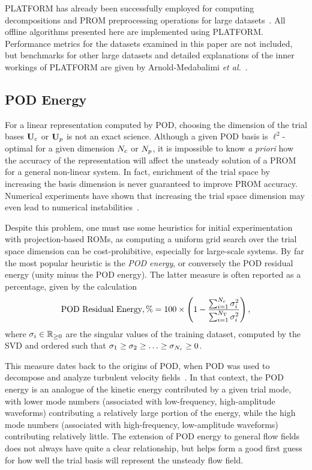 PLATFORM has already been successfully employed for computing decompositions and PROM preprocessing operations for large datasets~\cite{Wentland2021,ArnoldMedabalimi2020,Harvazinski2020,Pan2021,ArnoldMedabalimi2022}. All offline algorithms presented here are implemented using PLATFORM. Performance metrics for the datasets examined in this paper are not included, but benchmarks for other large datasets and detailed explanations of the inner workings of PLATFORM are given by Arnold-Medabalimi \textit{et al.}~\cite{PLATFORM}.

\subsection{POD Energy}
%
For a linear representation computed by POD, choosing the dimension of the trial bases $\consTrial$ or $\primTrial$ is not an exact science. Although a given POD basis is $\ell^2$-optimal for a given dimension $N_c$ or $N_p$, it is impossible to know \textit{a priori} how the accuracy of the representation will affect the unsteady solution of a PROM for a general non-linear system. In fact, enrichment of the trial space by increasing the basis dimension is never guaranteed to improve PROM accuracy. Numerical experiments have shown that increasing the trial space dimension may even lead to numerical instabilities~\cite{Huang2022}.

Despite this problem, one must use some heuristics for initial experimentation with projection-based ROMs, as computing a uniform grid search over the trial space dimension can be cost-prohibitive, especially for large-scale systems. By far the most popular heuristic is the \textit{POD energy}, or conversely the POD residual energy (unity minus the POD energy). The latter measure is often reported as a percentage, given by the calculation
%
\begin{equation}\label{eq:podEnergyResidual}
    \text{POD Residual Energy}, \% = 100 \times \left( 1 - \frac{\sum_{i=1}^{N_c} \sigma_{i}^2}{\sum_{i=1}^{N_{\text{T}}} \sigma_{i}^2} \right),
\end{equation}
%
where $\sigma_{i} \in \mathbb{R}_{\ge 0}$ are the singular values of the training dataset, computed by the SVD and ordered such that $\sigma_1 \ge \sigma_2 \ge \hdots \ge \sigma_{N_c} \ge 0$.

This measure dates back to the origins of POD, when POD was used to decompose and analyze turbulent velocity fields~\cite{berkoozPOD}. In that context, the POD energy is an analogue of the kinetic energy contributed by a given trial mode, with lower mode numbers (associated with low-frequency, high-amplitude waveforms) contributing a relatively large portion of the energy, while the high mode numbers (associated with high-frequency, low-amplitude waveforms) contributing relatively little. The extension of POD energy to general flow fields does not always have quite a clear relationship, but helps form a good first guess for how well the trial basis will represent the unsteady flow field.

